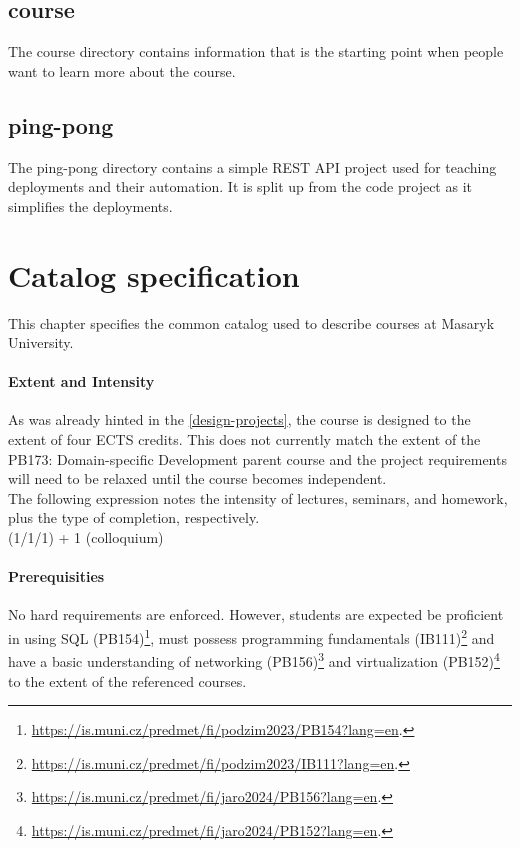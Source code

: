 \documentclass[
  digital,
  color,
  oneside,
  nosansbold,
  nocolorbold,
  nolof,
  nolot,
]{fithesis4}
\begin{document}
\section{course}

The course directory contains information that is the starting point when people want to learn more about the course.
\section{ping-pong}

The ping-pong directory contains a simple REST API project used for teaching deployments and their automation. It is split up from the code project as it simplifies the deployments.

\chapter{Catalog specification}

This chapter specifies the common catalog used to describe courses at Masaryk University. 

\subsubsection{Extent and Intensity}

As was already hinted in the \cref{design-projects}, the course is designed to the extent of four ECTS credits. This does not currently match the extent of the PB173: Domain-specific Development parent course and the project requirements will need to be relaxed until the course becomes independent. \\

\noindent
The following expression notes the intensity of lectures, seminars, and homework, plus the type of completion, respectively. \\

\noindent
(1/1/1) + 1 (colloquium)

\subsubsection{Prerequisities}

No hard requirements are enforced. However, students are expected be proficient in using SQL (PB154)\footnote{ \url{https://is.muni.cz/predmet/fi/podzim2023/PB154?lang=en}.}, must possess programming fundamentals (IB111)\footnote{ \url{https://is.muni.cz/predmet/fi/podzim2023/IB111?lang=en}.} and have a basic understanding of networking (PB156)\footnote{\url{https://is.muni.cz/predmet/fi/jaro2024/PB156?lang=en}.} and virtualization (PB152)\footnote{\url{https://is.muni.cz/predmet/fi/jaro2024/PB152?lang=en}.} to the extent of the referenced courses.
\end{document}
